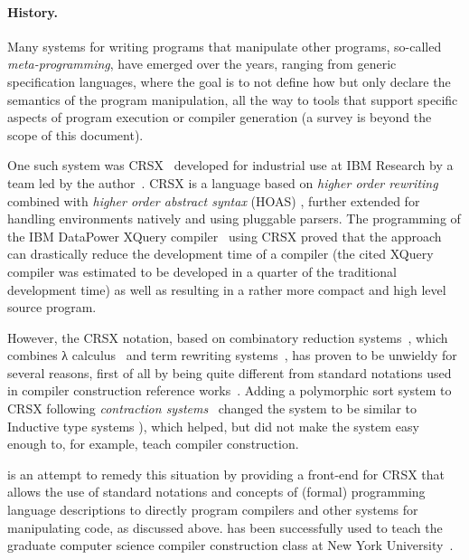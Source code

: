 \documentclass[12pt]{article} %
\begin{document}
\paragraph*{History.}

Many systems for writing programs that manipulate other programs, so-called \emph{meta-programming},
have emerged over the years, ranging from generic specification languages, where the goal is to not
define how but only declare the semantics of the program manipulation, all the way to tools that
support specific aspects of program execution or compiler generation (a survey is beyond the scope
of this document).

One such system was CRSX~\cite{Rose:1996} developed for industrial use at IBM Research by a team led
by the author~\cite{Rose:hor2007,Rose:hor2010,Rose:rta2011,crsx}.  CRSX is a language based on
\emph{higher order rewriting}~\cite{Jouannaud:klop2005} combined with \emph{higher order abstract
  syntax} (HOAS) \cite{PfenningElliot:pldi1988}, further extended for handling environments natively
and using pluggable parsers.  The programming of the IBM Data\-Power XQuery
compiler~\cite{dp60:ibm2013} using CRSX proved that the approach can drastically reduce the
development time of a compiler (the cited XQuery compiler was estimated to be developed in a quarter
of the traditional development time) as well as resulting in a rather more compact and high level
source program.

However, the CRSX notation, based on combinatory reduction systems~\cite{Klop:1980,Klop+:tcs1993},
which combines λ calculus~\cite{Church:1941,Barendregt:1984} and term rewriting
systems~\cite{Klop:1992:Handbook}, has proven to be unwieldy for several reasons, first of all by
being quite different from standard notations used in compiler construction reference
works~\cite{Aho+:2006}. Adding a polymorphic sort system to CRSX following \emph{contraction
  systems}~\cite{Aczel:1978} changed the system to be similar to Inductive type systems
\cite{BlanquiJouannaudOkada:tcs2002}), which helped, but did not make the system easy enough to, for
example, teach compiler construction.

\HAX is an attempt to remedy this situation by providing a front-end for CRSX that allows the use of
standard notations and concepts of (formal) programming language descriptions to directly program
compilers and other systems for manipulating code, as discussed above. \HAX has been successfully
used to teach the graduate computer science compiler construction class at New York
University~\cite{RoseRose:cims2015}.
\end{document}
